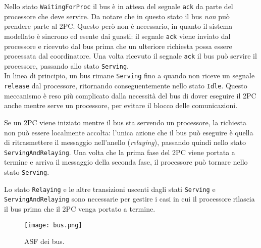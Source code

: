 Nello stato \texttt{WaitingForProc} il bus è in attesa del segnale \texttt{ack} da parte del processore che deve servire. Da notare che in questo stato il bus \textit{non} può prendere parte al 2PC. Questo però non è necessario, in quanto il sistema modellato è sincrono ed esente dai guasti: il segnale \texttt{ack} viene inviato dal processore e ricevuto dal bus prima che un ulteriore richiesta possa essere processata dal coordinatore. Una volta ricevuto il segnale \texttt{ack} il bus può servire il processore, passando allo stato \texttt{Serving}.\\


In linea di principio, un bus rimane \texttt{Serving} fino a quando non riceve un segnale \texttt{release} dal processore, ritornando conseguentemente nello stato \texttt{Idle}. Questo meccanismo è reso più complicato dalla necessità del bus di dover eseguire il 2PC anche mentre serve un processore, per evitare il blocco delle comunicazioni.

Se un 2PC viene iniziato mentre il bus sta servendo un processore, la richiesta non può essere localmente accolta: l'unica azione che il bus può eseguire è quella di ritrasmettere il messaggio nell'anello (\textit{relaying}), passando quindi nello stato \texttt{ServingAndRelaying}. Una volta che la prima fase del 2PC viene portata a termine e arriva il messaggio della seconda fase, il processore può tornare nello stato \texttt{Serving}.

Lo stato \texttt{Relaying} e le altre transizioni uscenti dagli stati \texttt{Serving} e \texttt{\justify ServingAndRelaying} sono necessarie per gestire i casi in cui il processore rilascia il bus prima che il 2PC venga portato a termine.

\begin{figure}[t]
\vspace{-2cm}
\centerline{\texttt{[image: bus.png]}}
\caption{ASF dei bus.}
\label{Fig:bus_fsm}
\end{figure}
